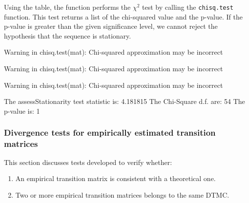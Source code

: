 \documentclass[
  nojss]{jss}
\providecommand{\tightlist}{%
  \setlength{\itemsep}{0pt}\setlength{\parskip}{0pt}}
\begin{document}
Using the table, the function performs the \(\chi ^2\) test by calling the \texttt{chisq.test} function.
This test returns a list of the chi-squared value and the p-value.
If the p-value is greater than the given significance level, we cannot reject the hypothesis that the sequence is stationary.

\begin{CodeChunk}



\begin{CodeOutput}
Warning in chisq.test(mat): Chi-squared approximation may be incorrect
\end{CodeOutput}

\begin{CodeOutput}
Warning in chisq.test(mat): Chi-squared approximation may be incorrect
\end{CodeOutput}

\begin{CodeOutput}
Warning in chisq.test(mat): Chi-squared approximation may be incorrect
\end{CodeOutput}

\begin{CodeOutput}
The assessStationarity test statistic is:  4.181815 
The Chi-Square d.f. are:  54 
The p-value is:  1 
\end{CodeOutput}
\end{CodeChunk}

\hypertarget{divergence-tests-for-empirically-estimated-transition-matrices}{%
\subsubsection{Divergence tests for empirically estimated transition matrices}\label{divergence-tests-for-empirically-estimated-transition-matrices}}

This section discusses tests developed to verify whether:

\begin{enumerate}
\def\labelenumi{\arabic{enumi}.}
\tightlist
\item
  An empirical transition matrix is consistent with a theoretical one.\\
\item
  Two or more empirical transition matrices belongs to the same DTMC.
\end{enumerate}
\end{document}
